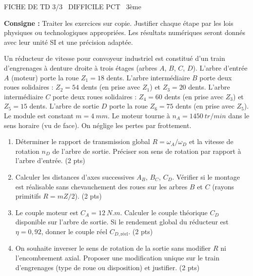 \documentclass[11pt]{article}
\begin{document}
\begin{tcolorbox}[enhanced,colback=popink,colframe=popink,arc=10pt,boxrule=0pt,left=12pt,right=12pt,top=9pt,bottom=9pt]
{\color{white}\popxbold\small FICHE DE TD 3/3 \textbullet\ DIFFICILE \hfill PCT \textbullet\ 3ème\par}
\end{tcolorbox}
\vspace{4pt}
\noindent\textbf{Consigne :} Traiter les exercices sur copie. Justifier chaque étape par les lois physiques ou technologiques appropriées. Les résultats numériques seront donnés avec leur unité SI et une précision adaptée.

\begin{exercice}
Un réducteur de vitesse pour convoyeur industriel est constitué d'un train d'engrenages à denture droite à trois étages (arbres $A$, $B$, $C$, $D$). L'arbre d'entrée $A$ (moteur) porte la roue $Z_1 = 18$ dents. L'arbre intermédiaire $B$ porte deux roues solidaires : $Z_2 = 54$ dents (en prise avec $Z_1$) et $Z_3 = 20$ dents. L'arbre intermédiaire $C$ porte deux roues solidaires : $Z_4 = 60$ dents (en prise avec $Z_3$) et $Z_5 = 15$ dents. L'arbre de sortie $D$ porte la roue $Z_6 = 75$ dents (en prise avec $Z_5$). Le module est constant $m = \SI{4}{mm}$. Le moteur tourne à $n_A = \SI{1450}{tr/min}$ dans le sens horaire (vu de face). On néglige les pertes par frottement.
\begin{enumerate}
    \item Déterminer le rapport de transmission global $R = \omega_A / \omega_D$ et la vitesse de rotation $n_D$ de l'arbre de sortie. Préciser son sens de rotation par rapport à l'arbre d'entrée. (2 pts)
    \item Calculer les distances d'axes successives $A_B$, $B_C$, $C_D$. Vérifier si le montage est réalisable sans chevauchement des roues sur les arbres $B$ et $C$ (rayons primitifs $R = mZ/2$). (2 pts)
    \item Le couple moteur est $C_A = \SI{12}{N.m}$. Calculer le couple théorique $C_D$ disponible sur l'arbre de sortie. Si le rendement global du réducteur est $\eta = 0,92$, donner le couple réel $C_{D,\text{réel}}$. (2 pts)
    \item On souhaite inverser le sens de rotation de la sortie sans modifier $R$ ni l'encombrement axial. Proposer une modification unique sur le train d'engrenages (type de roue ou disposition) et justifier. (2 pts)
\end{enumerate}
\end{exercice}
\end{document}
